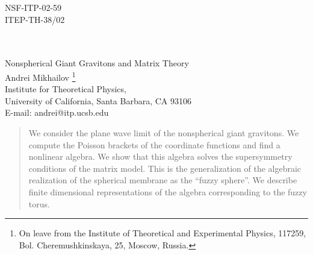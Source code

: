 \documentclass[a4paper,12pt]{article}
\begin{document}
\begin{titlepage}
\begin{flushright}
NSF-ITP-02-59\\
ITEP-TH-38/02\\
\end{flushright}

\begin{center}
{\Large \myHighlight{$  $}\coordHE{} \\ \myHighlight{$  $}\coordHE{} \\
Nonspherical Giant Gravitons and Matrix Theory}\\
\bigskip\bigskip\bigskip
{\large Andrei Mikhailov}
\footnote{On leave from the Institute of Theoretical and
Experimental Physics, 117259, Bol. Cheremushkinskaya, 25,
Moscow, Russia.}\\
\bigskip
Institute for Theoretical Physics,\\
University of California, Santa Barbara, CA 93106\\
\vskip 1cm
E-mail: andrei@itp.ucsb.edu
\end{center}
\vskip 1cm
\begin{abstract}
We consider the plane wave limit of the nonspherical giant gravitons.
We compute the Poisson brackets of the coordinate functions and find
a nonlinear algebra. We show that this algebra solves the supersymmetry
conditions of the matrix model. This is the generalization of the
algebraic realization of the spherical membrane as the ``fuzzy sphere''.
We describe finite dimensional representations of the algebra 
corresponding to the fuzzy torus.
\end{abstract}
\end{titlepage}
\end{document}
